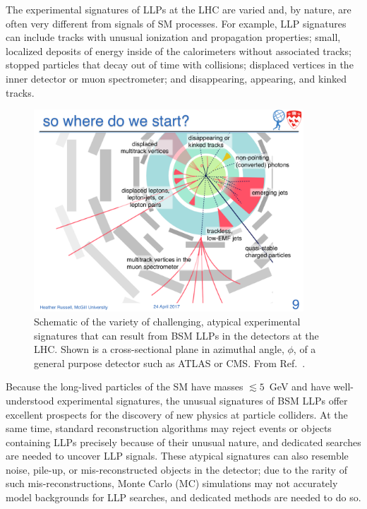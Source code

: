 The experimental signatures of LLPs at the LHC are varied and, by nature, are often very different from signals of SM processes.  For example, LLP signatures can include tracks with unusual ionization and propagation properties; small, localized deposits of energy inside of the calorimeters without associated tracks; stopped particles that decay out of time with collisions; displaced vertices in the inner detector or muon spectrometer; and disappearing, appearing, and kinked tracks.

\begin{figure}[htb]
\centering
\includegraphics[width=0.9\textwidth]{plots/Heather_Russell_20170424_LLPs_Slide9.pdf}
\caption{Schematic of the variety of challenging, atypical experimental signatures that can result from BSM LLPs in the detectors at the LHC.  Shown is a cross-sectional plane in azimuthal angle, $\phi$, of a general purpose detector such as ATLAS or CMS.  From Ref.~\cite{Russell:2017AprilWorkshop}.}
 \label{fig:LLPSignaturesWheel}
\end{figure}

Because the long-lived particles of the SM have masses $\lesssim5$~GeV and have well-understood experimental signatures, the unusual signatures of BSM LLPs offer excellent prospects for the discovery of new physics at particle colliders.
At the same time, standard reconstruction algorithms may reject events or objects containing LLPs precisely because of their unusual nature, and dedicated searches are needed to uncover LLP signals.
These atypical signatures can also resemble noise, pile-up, or mis-reconstructed objects in the detector; due to the rarity of such mis-reconstructions, Monte Carlo (MC) simulations may not accurately model backgrounds for LLP searches, and dedicated methods are needed to do so.

